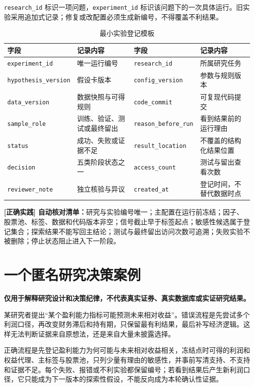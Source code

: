 \texttt{research\_id} 标识一项问题，\texttt{experiment\_id} 标识该问题下的一次具体运行。旧实验采用追加式记录；修复或改配置必须生成新编号，不得覆盖不利结果。

\begin{table}[htbp]
  \centering
  \footnotesize
  \caption{最小实验登记模板}
  \label{tab:ch01-experiment-registry}
  \begin{tabularx}{\textwidth}{p{3.0cm} Y p{3.0cm} Y}
    \toprule
    字段 & 记录内容 & 字段 & 记录内容 \\
    \midrule
    \texttt{experiment\_id} & 唯一运行编号 & \texttt{research\_id} & 所属研究任务 \\
    \texttt{hypothesis\_version} & 假设卡版本 & \texttt{config\_version} & 参数与规则版本 \\
    \texttt{data\_version} & 数据快照与可得规则 & \texttt{code\_commit} & 可复现代码提交 \\
    \texttt{sample\_role} & 训练、验证、测试或最终留出 & \texttt{reason\_before\_run} & 看到结果前的运行理由 \\
    \texttt{status} & 成功、失败或证据不足 & \texttt{result\_location} & 不覆盖的结构化结果位置 \\
    \texttt{decision} & 五类阶段状态之一 & \texttt{access\_count} & 测试与留出查看次数 \\
    \texttt{reviewer\_note} & 独立核验与异议 & \texttt{created\_at} & 登记时间，不替代数据时点 \\
    \bottomrule
  \end{tabularx}
\end{table}

\begin{practicebox}
\textbf{[正确实践] 自动核对清单：}研究与实验编号唯一；主配置在运行前冻结；因子、股票池、标签、数据和代码版本非空；信号截止早于标签起点；敏感性候选属于登记集合；探索结果不能写回主结论；测试与最终留出访问次数可追溯；失败实验不被删除；停止状态阻止进入下一阶段。
\end{practicebox}

\section{一个匿名研究决策案例}

\begin{casebox}
\textbf{仅用于解释研究设计和决策纪律，不代表真实证券、真实数据库或实证研究结果。}

某研究者提出“某个盈利能力指标可能预测未来相对收益”。错误流程是先尝试多个利润口径，再改变财务滞后和持有期，只保留最有利结果，最后补写经济逻辑。这样无法判断证据来自原想法，还是来自大量未披露选择。

正确流程是先登记盈利能力为何可能与未来相对收益相关，冻结点时可得的利润和权益代理、主标签与股票池，只列少量有理由的敏感性，并事前写清支持、不支持和证据不足。每个失败、报错或不利实验都保留编号；若看到结果后产生新利润口径，它只能成为下一版本的探索性假设，不能反向成为本轮确认性证据。
\end{casebox}

